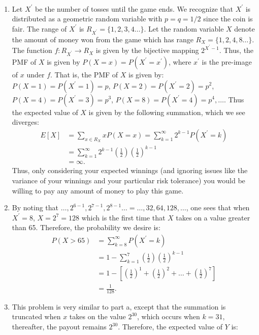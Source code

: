 \begin{problem}{22} $ $
\begin{enumerate}

\item Let $X^\prime$ be the number of tosses until the game ends.  We recognize that $X^\prime$ is distributed as a geometric random variable with $p=q=1/2$ since the coin is fair.   The range of $X^\prime$ is $R_{X^{\prime}}=\{1, 2, 3, 4 \ldots\}$.  Let the random variable $X$ denote the amount of money won from the game which has range $R_{X}=\{1, 2, 4, 8 \ldots\}$.  The function $f:R_{X^{\prime}}\rightarrow R_{X}$ is given by the bijective mapping $2^{X^{\prime}-1}$.  Thus, the PMF of $X$ is given by $P(X=x) = P(X^\prime=x^{\prime})$, where $x^\prime$ is the pre-image of $x$ under $f$.  That is, the PMF of $X$ is given by: $P(X=1) =P(X^\prime=1)=p$, $P(X=2) =P(X^\prime=2)=p^2$, $P(X=4) =P(X^\prime=3)=p^3$, $P(X=8) =P(X^\prime=4)=p^4, \ldots$.  Thus the expected value of $X$ is given by the following summation, which we see diverges:
\begin{align*}
E[X]& = \sum_{x \in R_X}xP(X=x) =\sum_{k=1}^\infty 2^{k-1}P(X^\prime=k) \\
& = \sum_{k=1}^\infty 2^{k-1} \left( \frac{1}{2} \right) \left(\frac{1}{2}\right)^{k-1} \\
& = \infty.
\end{align*}
Thus, only considering your expected winnings (and ignoring issues like the variance of your winnings and your particular risk tolerance) you would be willing to pay any amount of money to play this game.

\item By noting that $\ldots, 2^{6-1}, 2^{7-1}, 2^{8-1} \ldots = \ldots, 32, 64, 128, \ldots$, one sees that when $X^\prime=8$, $X=2^7 =128$ which is the first time that $X$ takes on a value greater than 65.  Therefore, the probability we desire is:
\begin{align*}
P(X>65) &= \sum_{k=8}^\infty P(X^\prime=k) \\
& = 1- \sum_{k=1}^7 \left(\frac{1}{2}\right)\left(\frac{1}{2}\right)^{k-1} \\
& = 1-\left[\left(\frac{1}{2}\right)^1+\left(\frac{1}{2}\right)^2+\ldots+\left(\frac{1}{2}\right)^7\right] \\
& = \frac{1}{128}.
\end{align*}

\item

This problem is very similar to part a, except that the summation is truncated when $x$ takes on the value $2^{30}$, which occurs when $k=31$, thereafter, the payout remains $2^{30}$.  Therefore, the expected value of $Y$ is:


\end{enumerate}
\end{problem}

